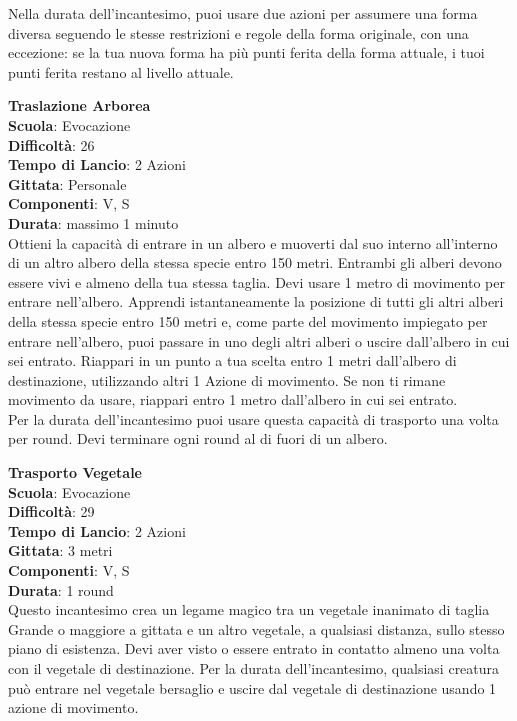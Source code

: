 \begin{multicols}{2}
Nella durata dell'incantesimo, puoi usare due azioni per assumere una forma diversa seguendo le stesse restrizioni e regole della forma originale, con una eccezione: se la tua nuova forma ha più punti ferita della forma attuale, i tuoi punti ferita restano al livello attuale.

\medskip\textbf{Traslazione Arborea}\\
\textbf{Scuola}: Evocazione\\
\textbf{Difficoltà}: 26\\
\textbf{Tempo di Lancio}: 2 Azioni\\
\textbf{Gittata}: Personale\\
\textbf{Componenti}: V, S\\
\textbf{Durata}: massimo 1 minuto\\
Ottieni la capacità di entrare in un albero e muoverti dal suo interno all'interno di un altro albero della stessa specie entro 150 metri. Entrambi gli alberi devono essere vivi e almeno della tua stessa taglia. Devi usare 1 metro di movimento per entrare nell'albero. Apprendi istantaneamente la posizione di tutti gli altri alberi della stessa specie entro 150 metri e, come parte del movimento impiegato per entrare nell'albero, puoi passare in uno degli altri alberi o uscire dall'albero in cui sei entrato. Riappari in un punto a tua scelta entro 1 metri dall'albero di destinazione, utilizzando altri 1 Azione di movimento. Se non ti rimane movimento da usare, riappari entro 1 metro dall'albero in cui sei entrato.\\
Per la durata dell'incantesimo puoi usare questa capacità di trasporto una volta per round. Devi terminare ogni round al di fuori di un albero.

\medskip\textbf{Trasporto Vegetale}\\
\textbf{Scuola}: Evocazione\\
\textbf{Difficoltà}: 29\\
\textbf{Tempo di Lancio}: 2 Azioni\\
\textbf{Gittata}: 3 metri\\
\textbf{Componenti}: V, S\\
\textbf{Durata}: 1 round\\
Questo incantesimo crea un legame magico tra un vegetale inanimato di taglia Grande o maggiore a gittata e un altro vegetale, a qualsiasi distanza, sullo stesso piano di esistenza. Devi aver visto o essere entrato in contatto almeno una volta con il vegetale di destinazione. Per la durata dell'incantesimo, qualsiasi creatura può entrare nel vegetale bersaglio e uscire dal vegetale di destinazione usando 1 azione di movimento.


\end{multicols}
